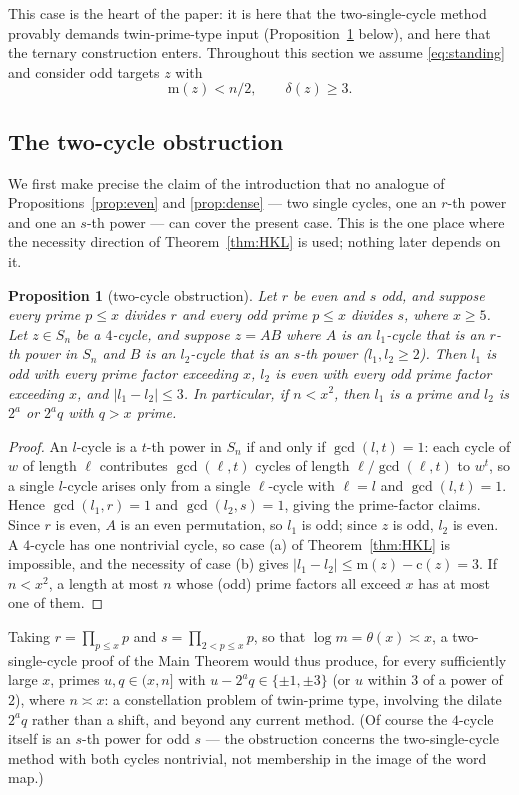 \documentclass[11pt]{amsart}
\numberwithin{equation}{section}
\newtheorem{proposition}[theorem]{Proposition}
\theoremstyle{remark}
\newcommand{\md}{\mathrm{m}}   %
\newcommand{\cy}{\mathrm{c}}   %
\begin{document}
This case is the heart of the paper: it is here that the two-single-cycle
method provably demands twin-prime-type input
(Proposition~\ref{prop:obstruction} below), and here that the ternary
construction enters.
Throughout this section we assume \eqref{eq:standing} and consider odd targets
$z$ with
\[
\md(z)<n/2,\qquad \delta(z)\ge 3 .
\]

\subsection{The two-cycle obstruction}\label{ssec:obstruction}
We first make precise the claim of the introduction that no analogue of
Propositions~\ref{prop:even} and \ref{prop:dense} --- two single cycles, one an
$r$-th power and one an $s$-th power --- can cover the present case. This is the
one place where the necessity direction of Theorem~\ref{thm:HKL} is used; nothing
later depends on it.

\begin{proposition}[two-cycle obstruction]\label{prop:obstruction}
Let $r$ be even and $s$ odd, and suppose every prime $p\le x$ divides $r$ and
every odd prime $p\le x$ divides $s$, where $x\ge 5$. Let $z\in S_n$ be a
$4$-cycle, and suppose $z=AB$ where $A$ is an $l_1$-cycle that is an $r$-th
power in $S_n$ and $B$ is an $l_2$-cycle that is an $s$-th power
($l_1,l_2\ge2$). Then $l_1$ is odd with every prime factor exceeding $x$, $l_2$
is even with every odd prime factor exceeding $x$, and $|l_1-l_2|\le 3$. In
particular, if $n<x^2$, then $l_1$ is a prime and $l_2$ is $2^a$ or $2^aq$ with
$q>x$ prime.
\end{proposition}

\begin{proof}
An $l$-cycle is a $t$-th power in $S_n$ if and only if $\gcd(l,t)=1$: each cycle
of $w$ of length $\ell$ contributes $\gcd(\ell,t)$ cycles of length
$\ell/\gcd(\ell,t)$ to $w^t$, so a single $l$-cycle arises only from a single
$\ell$-cycle with $\ell=l$ and $\gcd(l,t)=1$. Hence $\gcd(l_1,r)=1$ and
$\gcd(l_2,s)=1$, giving the prime-factor claims. Since $r$ is even, $A$ is an
even permutation, so $l_1$ is odd; since $z$ is odd, $l_2$ is even. A $4$-cycle
has one nontrivial cycle, so case (a) of Theorem~\ref{thm:HKL} is impossible, and
the necessity of case (b) gives $|l_1-l_2|\le \md(z)-\cy(z)=3$. If $n<x^2$, a
length at most $n$ whose (odd) prime factors all exceed $x$ has at most one of
them.
\end{proof}

Taking $r=\prod_{p\le x}p$ and $s=\prod_{2<p\le x}p$, so that
$\log m=\theta(x)\asymp x$, a two-single-cycle proof of the Main Theorem would
thus produce, for every sufficiently large $x$, primes $u,q\in(x,n]$ with
$u-2^aq\in\{\pm1,\pm3\}$ (or $u$ within $3$ of a power of $2$), where
$n\asymp x$: a constellation problem of twin-prime type, involving the dilate
$2^aq$ rather than a shift, and beyond any current method. (Of course the
$4$-cycle itself is an $s$-th power for odd $s$ --- the obstruction concerns the
two-single-cycle method with both cycles nontrivial, not membership in the image
of the word map.)
\end{document}

